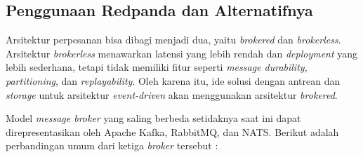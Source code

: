 \subsection{Penggunaan Redpanda dan Alternatifnya}

Arsitektur perpesanan bisa dibagi menjadi dua, yaitu \textit{brokered} dan \textit{brokerless}. Arsitektur \textit{brokerless} menawarkan latensi yang lebih rendah dan \textit{deployment} yang lebih sederhana, tetapi tidak memiliki fitur seperti \textit{message durability}, \textit{partitioning}, dan \textit{replayability}. Oleh karena itu, ide solusi dengan antrean dan \textit{storage} untuk arsitektur \textit{event-driven} akan menggunakan arsitektur \textit{brokered}.

Model \textit{message broker} yang saling berbeda setidaknya saat ini dapat direpresentasikan oleh Apache Kafka, RabbitMQ, dan NATS. Berikut adalah perbandingan umum dari ketiga \textit{broker} tersebut \parencite{arshadChoosingTheRightMessaging,royNatsRmqKafka,studyOnModeryMessaging}:

